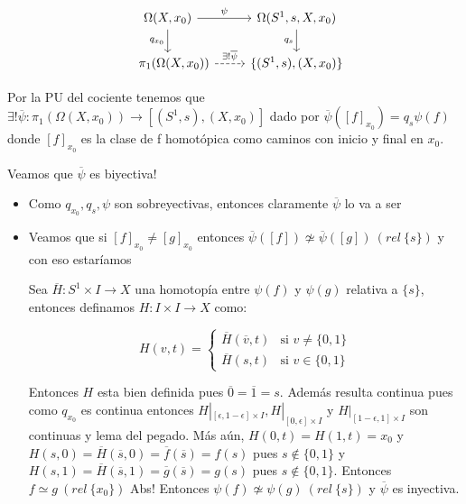 \documentclass[11pt]{article}
\newenvironment{proof}[1][Demostraci\'on]{\begin{trivlist}
\item[\hskip \labelsep {\bfseries #1}]}{\end{trivlist}}
\begin{document}
\begin{enumerate}
\begin{proof}
\begin{itemize}
\[
\begin{tikzcd}
\Omega(X,x_0) \arrow{r}{\psi} \arrow[swap]{d}{q_{x_0}} & \Omega(S^1,s,X,x_0) \arrow[swap]{d}{q_s} \\ \quad 
\pi_1(\Omega(X,x_0)) \arrow[dashed]{r}{\exists!\overline{\psi}} &  \{ (S^1,s),(X,x_0) \} 
\end{tikzcd}
\]

Por la PU del cociente tenemos que $\exists ! \overline{\psi}:\pi_1(\Omega(X,x_0)) \rightarrow [(S^1,s),(X,x_0)] $ dado por $\overline{\psi}([f]_{x_0})=q_s\psi(f)$ donde $[f]_{x_0}$ es la clase de f homot\'opica como caminos con inicio y final en $x_0$.

Veamos que $\overline{\psi}$ es biyectiva!

\begin{itemize}
\item Como $q_{x_0},q_s,\psi$ son sobreyectivas, entonces claramente $\overline{\psi}$ lo va a ser
\item Veamos que si $[f]_{x_0} \neq [g]_{x_0}$ entonces $\overline{\psi}([f]) \not \simeq \overline{\psi}([g]) \ (rel \ \{s\})$ y con eso estar\'iamos

Sea $\overline{H}:S^1 \times I \rightarrow X$ una homotop\'ia entre $\psi(f)$ y $\psi(g)$ relativa a $\{s\}$, entonces definamos $H: I \times I \rightarrow X$ como:

$$
H(v,t) =
\left\{
	\begin{array}{ll}
		\overline{H}(\overline{v},t)  & \mbox{si } v \neq \{0,1\} \\
		\overline{H}(s,t) & \mbox{si } v  \in \{0,1\}
	\end{array}
\right.
$$

Entonces $H$ esta bien definida pues $\overline{0}=\overline{1}=s$. Adem\'as resulta continua pues como $q_{x_0}$ es continua entonces $H|_{[\epsilon,1-\epsilon]\times I}, H|_{[0,\epsilon] \times I}$ y $H|_{[1-\epsilon , 1] \times I}$ son continuas y lema del pegado. M\'as a\'un, $H(0,t)=H(1,t)=x_0$ y $H(s,0)=\overline{H}(\overline{s},0)=\overline{f}(\overline{s})=f(s)$ pues $s \not \in \{0,1\}$ y $H(s,1)=\overline{H}(\overline{s},1)=\overline{g}(\overline{s})=g(s)$ pues $s \not \in \{0,1\}$. Entonces $f \simeq g \ (rel \ \{x_0\})$ Abs! Entonces $\psi(f) \not \simeq \psi(g) \ (rel \ \{s\})$ y $\overline{\psi}$ es inyectiva.

\end{itemize}

\end{itemize}


\end{proof}
\end{enumerate}
\end{document}
